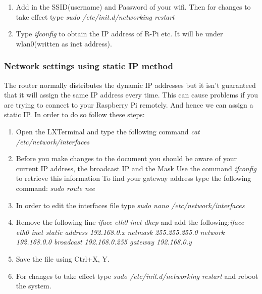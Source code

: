 \documentclass[11pt,a4paper]{article}
\begin{document}
\begin{enumerate}
\begin{figure}[h!]
			\centering
		\end{figure}
		\item Add in the SSID(username) and Password of your wifi. Then for changes to take effect type \textit{sudo /etc/init.d/networking restart} 
		\item Type \textit{ifconfig} to obtain the IP address of R-Pi etc. It will be under wlan0(written as inet address).
	\end{enumerate}
	
	\newpage
	\subsubsection{Network settings using static IP method}
	The router normally distributes the dynamic IP addresses but it isn’t guaranteed that it will assign the same IP address every time. This can cause problems if you are trying to connect to your Raspberry Pi remotely. And hence we can assign a static IP. In order to do so follow these steps:
	\begin{enumerate}
		\item Open the LXTerminal and type the following command \newline \textit{cat /etc/network/interfaces}
		\item Before you make changes to the document you should be aware of your current IP address, the broadcast IP and the Mask Use the command \textit{ifconfig} to retrieve this information
		To find your gateway address type the following command: \textit{sudo route \-nee}
		\item In order to edit the interfaces file type \textit{sudo nano /etc/network/interfaces}
		\item Remove the following line \textit{iface eth0 inet dhcp} and add the following:\newline \textit{iface eth0 inet static \newline address 192.168.0.x \newline netmask 255.255.255.0 \newline network 192.168.0.0 \newline broadcast 192.168.0.255 \newline gateway 192.168.0.y }
	    \item Save the file using Ctrl+X, Y.
	    \item For changes to take effect type \textit{sudo /etc/init.d/networking restart} and reboot the system.
    \end{enumerate}
	
\end{document}
